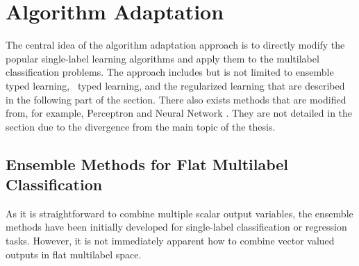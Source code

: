 {%
%
\section{Algorithm Adaptation}

The central idea of the algorithm adaptation approach is to directly modify the popular single-label learning algorithms and apply them to the multilabel classification problems.
The approach includes but is not limited to ensemble typed learning, \lr\ typed learning, and the regularized learning that are described in the following part of the section.
There also exists methods that are modified from, for example, Perceptron \citep{Crammer03afamily} and Neural Network \citep{Zhang06multilabel}.
They are not detailed in the section due to the divergence from the main topic of the thesis.



%
%
\subsection{Ensemble Methods for Flat Multilabel Classification} \label{sc_emfmlc}

As it is straightforward to combine multiple scalar output variables, the ensemble methods have been initially developed for single-label classification \citep{Breiman96bagging,Freund97a} or regression  \citep{Breiman96bagging} tasks.
However, it is not immediately apparent how to combine vector valued outputs in flat multilabel space.

}
